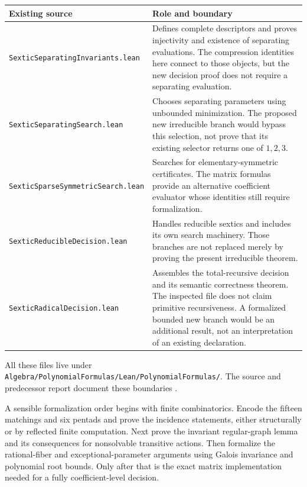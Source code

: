 \documentclass[11pt,letterpaper]{article}
\numberwithin{equation}{section}
\theoremstyle{definition}
\theoremstyle{remark}
\newcommand{\src}[1]{\texttt{\nolinkurl{#1}}}
\begin{document}
\begin{center}\small
\begin{longtable}{@{}p{}p{}@{}}
\toprule
Existing source & Role and boundary\\
\midrule
\endhead
\src{SexticSeparatingInvariants.lean}&
Defines complete descriptors and proves injectivity and existence of
separating evaluations. The compression identities here connect to those
objects, but the new decision proof does not require a separating evaluation.\\[5pt]
\src{SexticSeparatingSearch.lean}&
Chooses separating parameters using unbounded minimization. The proposed new
irreducible branch would bypass this selection, not prove that its existing
selector returns one of $1,2,3$.\\[5pt]
\src{SexticSparseSymmetricSearch.lean}&
Searches for elementary-symmetric certificates. The matrix formulas provide
an alternative coefficient evaluator whose identities still require
formalization.\\[5pt]
\src{SexticReducibleDecision.lean}&
Handles reducible sextics and includes its own search machinery. Those
branches are not replaced merely by proving the present irreducible theorem.\\[5pt]
\src{SexticRadicalDecision.lean}&
Assembles the total-recursive decision and its semantic correctness theorem.
The inspected file does not claim primitive recursiveness. A formalized
bounded new branch would be an additional result, not an interpretation of
an existing declaration.\\
\bottomrule
\end{longtable}
\end{center}

All these files live under
\src{Algebra/PolynomialFormulas/Lean/PolynomialFormulas/}. The source and
predecessor report document these boundaries
\cite{repo-decision,repo-invariants,repo-separating-search,repo-sparse-search,repo-reducible,tpo:separators}.

A sensible formalization order begins with finite combinatorics. Encode the
fifteen matchings and six pentads and prove the incidence statements, either
structurally or by reflected finite computation. Next prove the invariant
regular-graph lemma and its consequences for nonsolvable transitive actions.
Then formalize the rational-fiber and exceptional-parameter arguments using
Galois invariance and polynomial root bounds. Only after that is the exact
matrix implementation needed for a fully coefficient-level decision.
\end{document}
